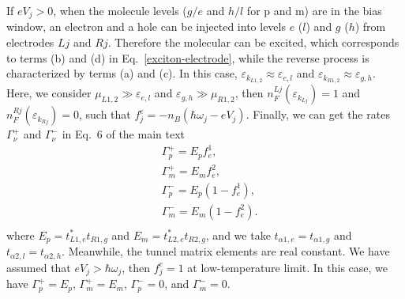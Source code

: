 \documentclass[aps,prb,
superscriptaddress,
,floatfix,footinbib,longbibliography,
preprint
]{revtex4-2}
\begin{document}
{If $eV_{j}>0$, when the molecule levels ($g/e$ and $h/l$ for p and m) are in the bias window, an electron and a hole can be injected into levels $e$ ($l$) and $g$ ($h$) from electrodes $Lj$ and $Rj$. Therefore the molecular can be excited, which corresponds to terms (b) and (d) in Eq.~\ref{exciton-electrode}, while the reverse process is characterized by terms (a) and (c).
In this case, $\varepsilon_{k_{L1,2}}\approx\varepsilon_{e,l}$ and $\varepsilon_{k_{R1,2}}\approx\varepsilon_{g,h}$. Here, we consider $\mu_{L1,2}\gg \varepsilon_{e,l}$ and $\varepsilon_{g,h}\gg \mu_{R1,2}$, then $n_{F}^{Lj}(\varepsilon_{k_{Lj}})=1$ and $n_{F}^{Rj}(\varepsilon_{k_{Rj}})=0$, such that $f_{j}^{e}=-n_{B}(\hbar\omega_{j}-eV_{j})$. Finally, we can get the rates $\Gamma_{\nu}^{+}$ and $\Gamma_{\nu}^{-}$ in Eq.~6 of the main text
\begin{equation}
\begin{split}
&\Gamma_{p}^{+}=E_{p}f_{e}^{1},\\
&\Gamma_{m}^{+}=E_{m}f_{e}^{2},\\
&\Gamma_{p}^{-}=E_{p}(1-f_{e}^{1}),\\
&\Gamma_{m}^{-}=E_{m}(1-f_{e}^{2}).\\
\end{split}
\end{equation}
where $E_{p}=t_{L1,e}^{\ast}t_{R1,g}$ and $E_{m}=t_{L2,e}^{\ast}t_{R2,g}$, and we take $t_{\alpha1,e}=t_{\alpha1,g}$ and $t_{\alpha2,l}=t_{\alpha2,h}$. Meanwhile, the tunnel matrix elements are real constant.
We have assumed that $eV_{j}>\hbar\omega_{j}$, then $f_{j}^{e}=1$ at low-temperature limit. In this case, we have $\Gamma_{p}^{+}=E_{p}$, $\Gamma_{m}^{+}=E_{m}$, $\Gamma_{p}^{-}=0$, and $\Gamma_{m}^{-}=0$.
}
\end{document}
